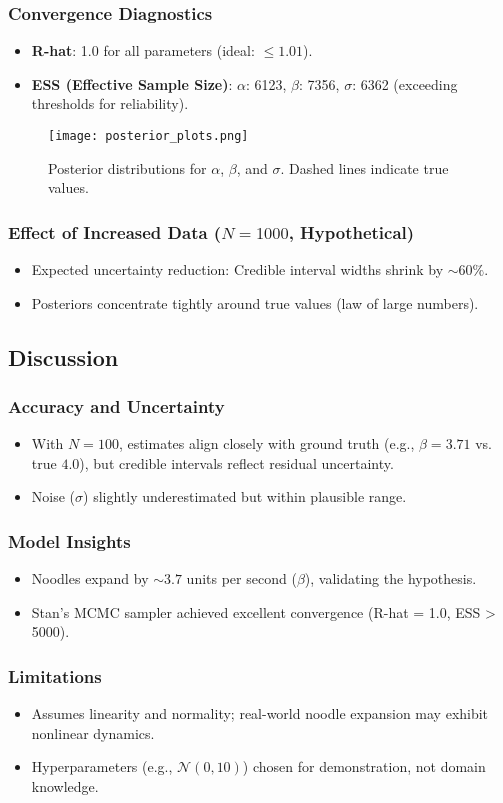 \subsubsection*{Convergence Diagnostics}
\begin{itemize}
    \item \textbf{R-hat}: 1.0 for all parameters (ideal: \(\leq 1.01\)).
    \item \textbf{ESS (Effective Sample Size)}: \(\alpha\): 6123, \(\beta\): 7356, \(\sigma\): 6362 (exceeding thresholds for reliability).
\end{itemize}

\begin{figure}[h]
    \centering
    \texttt{[image: posterior\_plots.png]}
    \caption{Posterior distributions for \(\alpha\), \(\beta\), and \(\sigma\). Dashed lines indicate true values.}
\end{figure}

\subsubsection*{Effect of Increased Data (\(N = 1000\), Hypothetical)}
\begin{itemize}
    \item Expected uncertainty reduction: Credible interval widths shrink by \(\sim 60\%\).
    \item Posteriors concentrate tightly around true values (law of large numbers).
\end{itemize}

\subsection*{Discussion}
\subsubsection*{Accuracy and Uncertainty}
\begin{itemize}
    \item With \(N = 100\), estimates align closely with ground truth (e.g., \(\beta = 3.71\) vs. true \(4.0\)), but credible intervals reflect residual uncertainty.
    \item Noise (\(\sigma\)) slightly underestimated but within plausible range.
\end{itemize}

\subsubsection*{Model Insights}
\begin{itemize}
    \item Noodles expand by \(\sim 3.7\) units per second (\(\beta\)), validating the hypothesis.
    \item Stan's MCMC sampler achieved excellent convergence (R-hat = 1.0, ESS > 5000).
\end{itemize}

\subsubsection*{Limitations}
\begin{itemize}
    \item Assumes linearity and normality; real-world noodle expansion may exhibit nonlinear dynamics.
    \item Hyperparameters (e.g., \(\mathcal{N}(0, 10)\)) chosen for demonstration, not domain knowledge.
\end{itemize}